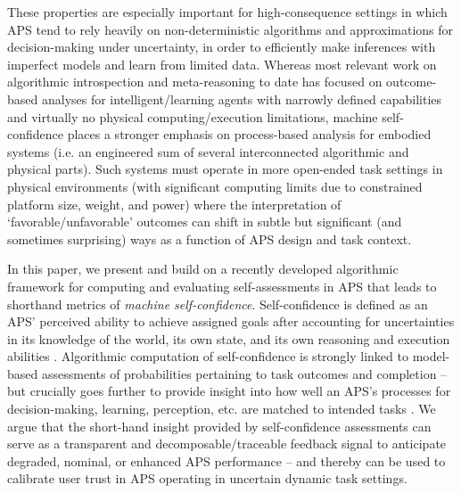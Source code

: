 These properties are especially important for high-consequence settings in which APS tend to rely heavily on non-deterministic algorithms and approximations for decision-making under uncertainty, in order to efficiently make inferences with imperfect models and learn from limited data. 
Whereas most relevant work on algorithmic introspection and meta-reasoning to date %
has focused on outcome-based analyses for intelligent/learning agents with narrowly defined capabilities and virtually no physical computing/execution limitations, machine self-confidence places a stronger emphasis on process-based analysis for embodied systems (i.e. an engineered sum of several interconnected algorithmic and physical parts). Such systems must operate in more open-ended task settings in physical environments (with significant computing limits due to constrained platform size, weight, and power) where the interpretation of `favorable/unfavorable' outcomes can shift in subtle but significant (and sometimes surprising) ways as a function of APS design and task context. 

In this paper, we present and build on a recently developed algorithmic framework for computing and evaluating self-assessments in APS that leads to shorthand metrics of \emph{machine self-confidence}. Self-confidence is defined as an APS' perceived ability to achieve assigned goals after accounting for uncertainties in its knowledge of the world, its own state, and its own reasoning and execution abilities \cite{Aitken2016-cv, Aitken2016-fb, Sweet2016-tz}. 
Algorithmic computation of self-confidence is strongly linked to model-based assessments of probabilities pertaining to task outcomes and completion -- but crucially goes further to provide insight into how well an APS's processes for decision-making, learning, perception, etc. are matched to intended tasks \cite{Hutchins2015-if}. 
We argue that the short-hand insight provided by self-confidence assessments can serve as a transparent and decomposable/traceable feedback signal to anticipate degraded, nominal, or enhanced APS performance -- %
and thereby can be used to calibrate user trust in APS operating in uncertain dynamic task settings. 

